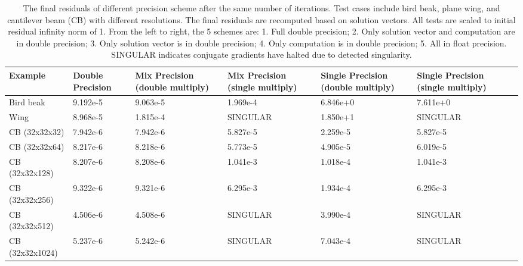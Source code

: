\newpage
\begin{table}
\centering
\tiny
\caption{The final residuals of different precision scheme after the same number of iterations. Test cases include bird beak, plane wing, and cantilever beam (CB) with different resolutions. The final residuals are recomputed based on solution vectors. All tests are scaled to initial residual infinity norm of 1. From the left to right, the 5 schemes are: 1. Full double precision; 2. Only solution vector and computation are in double precision; 3. Only solution vector is in double precision; 4. Only computation is in double precision; 5. All in float precision. SINGULAR indicates conjugate gradients have halted due to detected singularity.}
{
\begin{tabularx}{.95\linewidth}{l@{\hskip3.5pt}lXXXXX}
\toprule
	Example			& Double Precision 	& Mix Precision	\newline (double multiply) 	& Mix Precision \newline (single multiply) & Single Precision \newline (double multiply) & Single Precision \newline (single multiply) \\
  	\midrule
	Bird beak	& 	9.192e-5	& 	9.063e-5	& 	1.969e-4 	& 	6.846e+0 	&	7.611e+0 	\\
    Wing		&	8.968e-5	&	1.815e-4	&	SINGULAR	&	1.850e+1	& 	SINGULAR	\\
    CB (32x32x32)	&	7.942e-6	&	7.942e-6	& 5.827e-5	& 2.259e-5	&	5.827e-5	\\
    CB (32x32x64)	&	8.217e-6	&	8.218e-6	& 5.773e-5	& 4.905e-5	&	6.019e-5	\\
    CB (32x32x128)	&	8.207e-6	&	8.208e-6	& 1.041e-3	& 1.018e-4	&	1.041e-3	\\
    CB (32x32x256)	&	9.322e-6	&	9.321e-6	& 6.295e-3	& 1.934e-4	&	6.295e-3	\\
    CB (32x32x512)	&	4.506e-6	&	4.508e-6	& SINGULAR	& 3.990e-4	&	SINGULAR	\\
    CB (32x32x1024)&	5.237e-6	&	5.242e-6	& SINGULAR	& 7.043e-4	&	SINGULAR	\\
    \midrule
\end{tabularx}
}
\label{tab:mix_precision}
\end{table}
